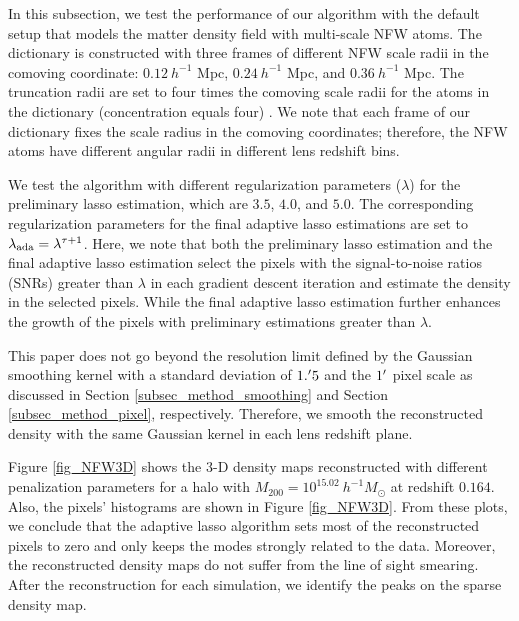 In this subsection, we test the performance of our algorithm with the default
setup that models the matter density field with multi-scale NFW atoms. The
dictionary is constructed with three frames of different NFW scale radii in the
comoving coordinate: $0.12~h^{-1}$ Mpc, $0.24~h^{-1}$ Mpc, and $0.36~h^{-1}$
Mpc.  The truncation radii are set to four times the comoving scale radii for
the atoms in the dictionary (concentration equals four) . We note that each
frame of our dictionary fixes the scale radius in the comoving coordinates;
therefore, the NFW atoms have different angular radii in different lens
redshift bins.

We test the algorithm with different regularization parameters ($\lambda$) for
the preliminary lasso estimation, which are $3.5$, $4.0$, and $5.0$. The
corresponding regularization parameters for the final adaptive lasso
estimations are set to $\lambda_{\rm{ada}}=\lambda^{\tau+1}$.  Here, we note
that both the preliminary lasso estimation and the final adaptive lasso
estimation select the pixels with the signal-to-noise ratios (SNRs) greater
than $\lambda$ in each gradient descent iteration and estimate the density in
the selected pixels. While the final adaptive lasso estimation further enhances
the growth of the pixels with preliminary estimations greater than $\lambda$.

This paper does not go beyond the resolution limit defined by the Gaussian
smoothing kernel with a standard deviation of $1.\mbox{$^\prime$} 5$ and the $1\mbox{$^\prime$}$
pixel scale as discussed in Section \ref{subsec_method_smoothing} and Section
\ref{subsec_method_pixel}, respectively.  Therefore, we smooth the
reconstructed density with the same Gaussian kernel in each lens redshift
plane.

Figure \ref{fig_NFW3D} shows the $3$-D density maps reconstructed with
different penalization parameters for a halo with $M_{200}=10^{15.02}
~h^{-1}M_{\odot}$ at redshift $0.164$. Also, the pixels' histograms are shown
in Figure \ref{fig_NFW3D}. From these plots, we conclude that the adaptive
lasso algorithm sets most of the reconstructed pixels to zero and only keeps
the modes strongly related to the data. Moreover, the reconstructed density maps
do not suffer from the line of sight smearing. After the reconstruction for
each simulation, we identify the peaks on the sparse density map.

